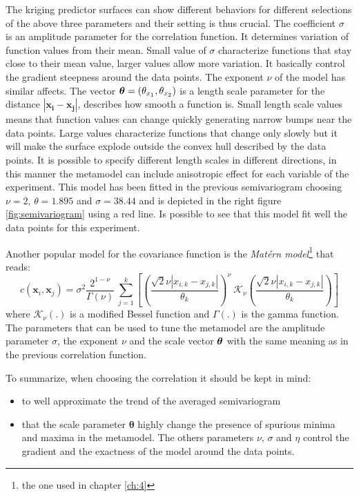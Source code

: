 The kriging predictor surfaces can show different behaviors for different selections of the above three parameters and their setting is thus crucial.
The coefficient $\sigma$ is an amplitude parameter for the correlation function. It determines variation of function values from their mean. Small value of $\sigma$ characterize functions that stay close to their mean value, larger values allow more variation. It basically control the gradient steepness around the data points. The exponent $\nu$ of the model has similar affects.
The vector $\boldsymbol{\theta}=(\theta_{x_1}, \theta_{x_2})$ is a length scale parameter for the distance $|\mathbf{x_i} - \mathbf{x_j}|$, describes how smooth a function is. Small length scale values means that function values can change quickly generating narrow bumps near the data points. Large values characterize functions that change only slowly but it will make the surface explode outside the convex hull described by the data points. It is possible to specify different length scales in different directions, in this manner the metamodel can include anisotropic effect for each variable of the experiment.
This model has been fitted in the previous semivariogram choosing $\nu=2$, $\theta=1.895$ and $\sigma=38.44$ and is depicted in the right figure \ref{fig:semivariogram} using a red line. Is possible to see that this model fit well the data points for this experiment.

Another popular model for the covariance function is the \textit{Mat\'ern model}\footnote{the one used in chapter \ref{ch:4}} that reads:
\begin{equation}
c(\mathbf{x}_{i} , \mathbf{x}_{j}) = \sigma^2 \dfrac{2^{1- \nu}}{\Gamma(\nu)} \ \sum_{j=1}^{k} \left[ \left( \dfrac{\sqrt{2} \nu |{x}_{i,k} - {x}_{j,k} |}{\theta_k} \right)^{\nu} \ \mathcal{K}_{\nu}\left( \dfrac{\sqrt{2} \nu |{x}_{i,k} - {x}_{j,k} |}{\theta_k} \right) \right]
\label{eq:matern2}
\end{equation}
where $\mathcal{K}_{\nu}(.)$ is a modified Bessel function and $\Gamma(.)$ is the gamma function.
The parameters that can be used to tune the metamodel are the amplitude parameter $\sigma$, the exponent $\nu$ and the scale vector $\boldsymbol{\theta}$ with the same meaning as in the previous correlation function.

To summarize, when choosing the correlation it should be kept in mind:
\begin{itemize}
	\item to well approximate the trend of the averaged semivariogram
	\item that the scale parameter $\boldsymbol{\theta}$ highly change the presence of spurious minima and maxima in the metamodel. The others parameters $\nu$, $\sigma$ and $\eta$ control the gradient and the exactness of the model around the data points.
\end{itemize}

